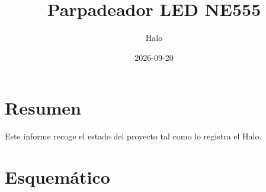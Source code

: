 \documentclass[a4paper,11pt]{article}
\title{Parpadeador LED NE555}
\author{Halo}
\date{2026-09-20}
\begin{document}
\maketitle

\section{Resumen}

Este informe recoge el estado del proyecto tal como lo registra el Halo.

\section{Esquemático}
\end{document}
